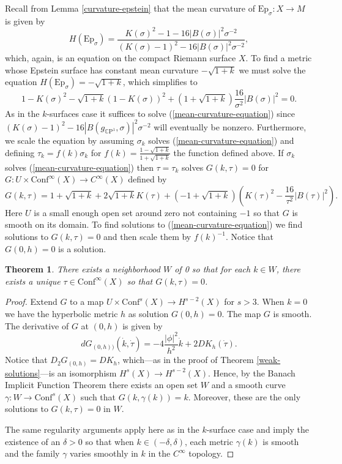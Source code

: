\documentclass{amsart}
\newcommand{\CP}{\mathbb{C}\mathrm{P}}
\newtheorem{thm}{Theorem}[section]
\begin{document}
Recall from Lemma \ref{curvature-epstein} that the mean curvature of $\mathrm{Ep}_\sigma: X \to M$ is given by 
\[
H(\mathrm{Ep}_\sigma)
= \frac{K(\sigma)^2 - 1 - 16|B(\sigma)|^2\sigma^{-2}}{(K(\sigma) - 1)^2 - 16|B(\sigma)|^2\sigma^{-2}},
\]
which, again, is an equation on the compact Riemann surface $X$.
To find a metric whose Epstein surface has constant mean curvature $-\sqrt{1+k}$ we must solve the equation $H(\mathrm{Ep}_\sigma) = -\sqrt{1+k}$, which simplifies to
\begin{equation}
\label{mean-curvature-equation}
1-K(\sigma)^2 - \sqrt{1+k}(1-K(\sigma))^2 + (1 + \sqrt{1+k})\frac{16}{\sigma^2}|B(\sigma)|^2 = 0.
\end{equation}
As in the $k$-surfaces case it suffices to solve (\ref{mean-curvature-equation}) since $(K(\sigma) - 1)^2 - 16|B(g_{\CP^1},\sigma)|^2\sigma^{-2}$ will eventually be nonzero.
Furthermore, we scale the equation by assuming $\sigma_k$ solves (\ref{mean-curvature-equation}) and defining $\tau_k = f(k) \sigma_k$ for $f(k) = \frac{1-\sqrt{1+k}}{1+\sqrt{1+k}}$ the function defined above. 
If $\sigma_k$ solves (\ref{mean-curvature-equation}) then $\tau = \tau_k$ solves $G(k,\tau) = 0$ for $G: U \times \mathrm{Conf}^\infty(X) \to C^\infty(X)$ defined by 
\[
G(k,\tau) = 1+\sqrt{1+k} + 2\sqrt{1+k}K(\tau) + (-1 + \sqrt{1+k})(K(\tau)^2 - \frac{16}{\tau^2}|B(\tau)|^2).
\]
Here $U$ is a small enough open set around zero not containing $-1$ so that $G$ is smooth on its domain.
To find solutions to (\ref{mean-curvature-equation}) we find solutions to $G(k,\tau) = 0$ and then scale them by $f(k)^{-1}$. 
Notice that $G(0,h) = 0$ is a solution. 

\begin{thm}
There exists a neighborhood $W$ of 0 so that for each $k \in W$, there exists a unique $\tau \in \mathrm{Conf}^\infty(X)$ so that $G(k,\tau) = 0$.
\end{thm}

\begin{proof}
Extend $G$ to a map $U \times \mathrm{Conf}^s(X) \to H^{s-2}(X)$ for $s > 3$. 
When $k = 0$ we have the hyperbolic metric $h$ as solution $G(0,h) = 0$. 
The map $G$ is smooth. 
The derivative of $G$ at $(0,h)$ is given by 
\[
dG_{(0,h))}(\dot{k},\dot{\tau}) = -4 \frac{|\phi|^2}{h^2} \dot{k} + 2 D K_h(\dot{\tau}).
\]
Notice that $D_2 G_{(0,h)} = D K_h$, which---as in the proof of Theorem \ref{weak-solutions}---is an isomorphism $H^s(X) \to H^{s-2}(X)$.
Hence, by the Banach Implicit Function Theorem there exists an open set $W$ and a smooth curve $\gamma: W \to \mathrm{Conf}^{s}(X)$ such that $G(k,\gamma(k)) = k$. 
Moreover, these are the only solutions to $G(k,\tau) = 0$ in $W$.

The same regularity arguments apply here as in the $k$-surface case and imply the existence of an $\delta > 0$ so that when $k \in (-\delta,\delta)$, each metric $\gamma(k)$ is smooth and the family $\gamma$ varies smoothly in $k$ in the $C^\infty$ topology. 
\end{proof}
\end{document}
